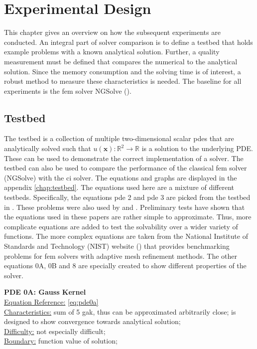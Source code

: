 \documentclass[./\jobname.tex]{subfiles}
\begin{document}
\chapter{Experimental Design}
This chapter gives an overview on how the subsequent experiments are conducted. An integral part of solver comparison is to define a testbed that holds example problems with a known analytical solution. Further, a quality measurement must be defined that compares the numerical to the analytical solution. Since the memory consumption and the solving time is of interest, a robust method to measure these characteristics is needed. The baseline for all experiments is the \gls{fem} solver NGSolve (\cite{schoberl_ngsolvengsolve_2020}). 

\section{Testbed}
\label{chap:testbed_description}
The testbed is a collection of multiple two-dimensional scalar \gls{pde}s that are analytically solved such that $u(\mathbf{x}): \mathbb{R}^2 \rightarrow \mathbb{R}$ is a solution to the underlying PDE. These can be used to demonstrate the correct implementation of a solver. The testbed can also be used to compare the performance of the classical \gls{fem} solver (NGSolve) with the \gls{ci} solver. The equations and graphs are displayed in the appendix \ref{chap:testbed}. The equations used here are a mixture of different testbeds. Specifically, the equations \gls{pde} 2 and \gls{pde} 3 are picked from the testbed in \cite{chaquet_using_2019}. These problems were also used by \cite{tsoulos_solving_2006} and \cite{panagant_solving_2014}. Preliminary tests have shown that the equations used in these papers are rather simple to approximate. Thus, more complicate equations are added to test the solvability over a wider variety of functions. The more complex equations are taken from the National Institute of Standards and Technology (NIST) website (\cite{mitchell_nist_2018}) that provides benchmarking problems for \gls{fem} solvers with adaptive mesh refinement methods. The other equations 0A, 0B and 8 are specially created to show different properties of the solver. 

\textbf{PDE 0A: Gauss Kernel} \\
\underline{Equation Reference:} \eqref{eq:pde0a} \\
\underline{Characteristics:} sum of 5 \gls{gak}, thus can be approximated arbitrarily close; is designed to show convergence towards analytical solution; \\
\underline{Difficulty:} not especially difficult; \\
\underline{Boundary:} function value of solution; \\
\end{document}
